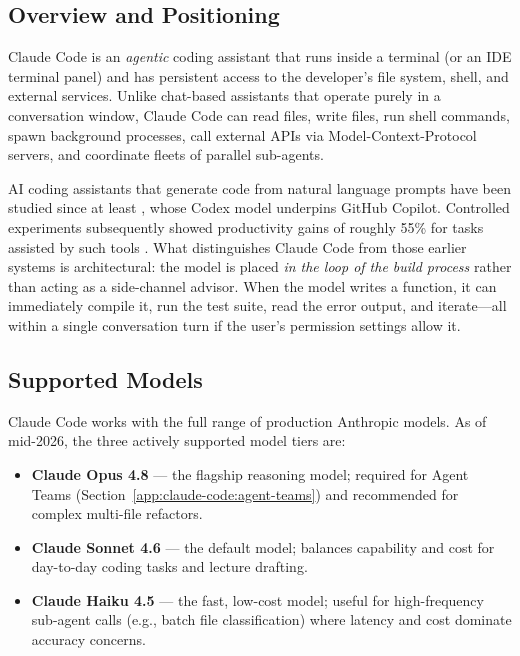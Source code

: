 \subsection{Overview and Positioning}
\label{app:claude-code:positioning}

Claude Code is an \emph{agentic} coding assistant that runs inside a terminal
(or an IDE terminal panel) and has persistent access to the developer's file
system, shell, and external services.  Unlike chat-based assistants that operate
purely in a conversation window, Claude Code can read files, write files, run
shell commands, spawn background processes, call external APIs via
Model-Context-Protocol servers, and coordinate fleets of parallel sub-agents.

AI coding assistants that generate code from natural language prompts have been
studied since at least \citet{chen2021evaluating}, whose Codex model underpins
GitHub Copilot.  Controlled experiments subsequently showed productivity gains
of roughly 55\% for tasks assisted by such tools \citep{peng2023impact}.  What
distinguishes Claude Code from those earlier systems is architectural: the model
is placed \emph{in the loop of the build process} rather than acting as a
side-channel advisor.  When the model writes a function,
it can immediately compile it, run the test suite, read the error output, and
iterate---all within a single conversation turn if the user's permission settings
allow it.

\subsection{Supported Models}
\label{app:claude-code:models}

Claude Code works with the full range of production Anthropic models.  As of
mid-2026, the three actively supported model tiers are:

\begin{itemize}
  \item \textbf{Claude Opus 4.8} --- the flagship reasoning model; required for
        Agent Teams (Section~\ref{app:claude-code:agent-teams}) and
        recommended for complex multi-file refactors.
  \item \textbf{Claude Sonnet 4.6} --- the default model; balances capability
        and cost for day-to-day coding tasks and lecture drafting.
  \item \textbf{Claude Haiku 4.5} --- the fast, low-cost model; useful for
        high-frequency sub-agent calls (e.g., batch file classification) where
        latency and cost dominate accuracy concerns.
\end{itemize}


